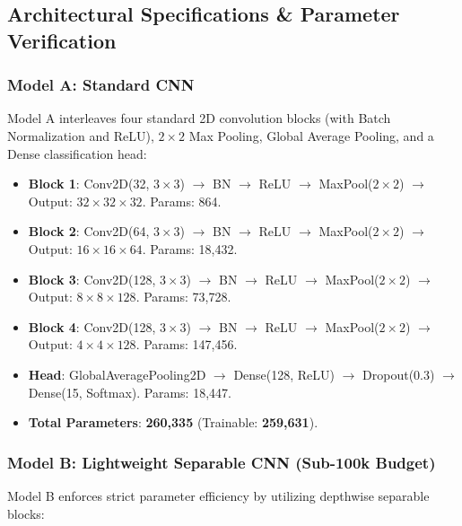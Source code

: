 \subsection{Architectural Specifications \& Parameter Verification}

\subsubsection{Model A: Standard CNN}

Model A interleaves four standard 2D convolution blocks (with Batch Normalization and ReLU), $2 \times 2$ Max Pooling, Global Average Pooling, and a Dense classification head:

\begin{itemize}
    \item \textbf{Block 1}: Conv2D(32, $3 \times 3$) $\rightarrow$ BN $\rightarrow$ ReLU $\rightarrow$ MaxPool($2 \times 2$) $\rightarrow$ Output: $32 \times 32 \times 32$. Params: 864.
    \item \textbf{Block 2}: Conv2D(64, $3 \times 3$) $\rightarrow$ BN $\rightarrow$ ReLU $\rightarrow$ MaxPool($2 \times 2$) $\rightarrow$ Output: $16 \times 16 \times 64$. Params: 18,432.
    \item \textbf{Block 3}: Conv2D(128, $3 \times 3$) $\rightarrow$ BN $\rightarrow$ ReLU $\rightarrow$ MaxPool($2 \times 2$) $\rightarrow$ Output: $8 \times 8 \times 128$. Params: 73,728.
    \item \textbf{Block 4}: Conv2D(128, $3 \times 3$) $\rightarrow$ BN $\rightarrow$ ReLU $\rightarrow$ MaxPool($2 \times 2$) $\rightarrow$ Output: $4 \times 4 \times 128$. Params: 147,456.
    \item \textbf{Head}: GlobalAveragePooling2D $\rightarrow$ Dense(128, ReLU) $\rightarrow$ Dropout(0.3) $\rightarrow$ Dense(15, Softmax). Params: 18,447.
    \item \textbf{Total Parameters}: \textbf{260,335} (Trainable: \textbf{259,631}).
\end{itemize}

\subsubsection{Model B: Lightweight Separable CNN (Sub-100k Budget)}

Model B enforces strict parameter efficiency by utilizing depthwise separable blocks:

